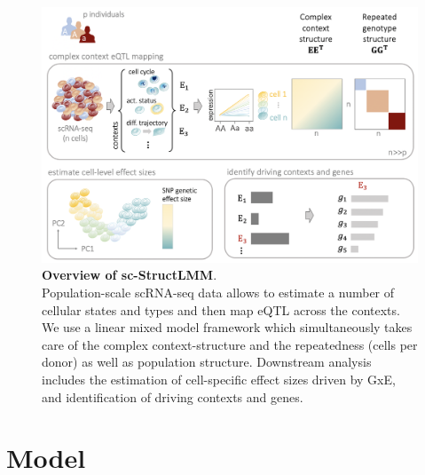 \begin{figure}[htbp]
\centering
\includegraphics[width=15.5cm]{Chapter6/Fig/sc_structlmm_overview2.png}
\caption[Overview of sc-StructLMM]{\textbf{Overview of sc-StructLMM}.\\
Population-scale scRNA-seq data allows to estimate a number of cellular states and types and then map eQTL across the contexts.
We use a linear mixed model framework which simultaneously takes care of the complex context-structure and the repeatedness (cells per donor) as well as population structure.
Downstream analysis includes the estimation of cell-specific effect sizes driven by GxE, and identification of driving contexts and genes.}
\label{fig:sc_structlmm_overview}
\end{figure}



\clearpage

\section{Model} 


